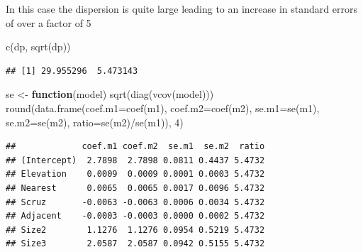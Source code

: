\documentclass[
  ignorenonframetext,
]{beamer}
\newenvironment{Shaded}{\begin{snugshade}}{\end{snugshade}}
\newcommand{\AttributeTok}[1]{\textcolor[rgb]{0.77,0.63,0.00}{#1}}
\newcommand{\ControlFlowTok}[1]{\textcolor[rgb]{0.13,0.29,0.53}{\textbf{#1}}}
\newcommand{\DecValTok}[1]{\textcolor[rgb]{0.00,0.00,0.81}{#1}}
\newcommand{\FunctionTok}[1]{\textcolor[rgb]{0.00,0.00,0.00}{#1}}
\newcommand{\NormalTok}[1]{#1}
\newcommand{\OtherTok}[1]{\textcolor[rgb]{0.56,0.35,0.01}{#1}}
\newcommand{\SpecialCharTok}[1]{\textcolor[rgb]{0.00,0.00,0.00}{#1}}
\begin{document}
\begin{frame}[fragile]{}
\protect\hypertarget{section-5}{}
In this case the dispersion is quite large leading to an increase in
standard errors of over a factor of 5

\vspace{12pt}
\tiny

\begin{Shaded}
\begin{Highlighting}[]
\FunctionTok{c}\NormalTok{(dp, }\FunctionTok{sqrt}\NormalTok{(dp))}
\end{Highlighting}
\end{Shaded}

\begin{verbatim}
## [1] 29.955296  5.473143
\end{verbatim}

\begin{Shaded}
\begin{Highlighting}[]
\NormalTok{se }\OtherTok{\textless{}{-}} \ControlFlowTok{function}\NormalTok{(model) }\FunctionTok{sqrt}\NormalTok{(}\FunctionTok{diag}\NormalTok{(}\FunctionTok{vcov}\NormalTok{(model)))}
\FunctionTok{round}\NormalTok{(}\FunctionTok{data.frame}\NormalTok{(}\AttributeTok{coef.m1=}\FunctionTok{coef}\NormalTok{(m1), }\AttributeTok{coef.m2=}\FunctionTok{coef}\NormalTok{(m2), }\AttributeTok{se.m1=}\FunctionTok{se}\NormalTok{(m1), }\AttributeTok{se.m2=}\FunctionTok{se}\NormalTok{(m2), }
                 \AttributeTok{ratio=}\FunctionTok{se}\NormalTok{(m2)}\SpecialCharTok{/}\FunctionTok{se}\NormalTok{(m1)), }\DecValTok{4}\NormalTok{)}
\end{Highlighting}
\end{Shaded}

\begin{verbatim}
##             coef.m1 coef.m2  se.m1  se.m2  ratio
## (Intercept)  2.7898  2.7898 0.0811 0.4437 5.4732
## Elevation    0.0009  0.0009 0.0001 0.0003 5.4732
## Nearest      0.0065  0.0065 0.0017 0.0096 5.4732
## Scruz       -0.0063 -0.0063 0.0006 0.0034 5.4732
## Adjacent    -0.0003 -0.0003 0.0000 0.0002 5.4732
## Size2        1.1276  1.1276 0.0954 0.5219 5.4732
## Size3        2.0587  2.0587 0.0942 0.5155 5.4732
\end{verbatim}
\end{frame}
\end{document}
